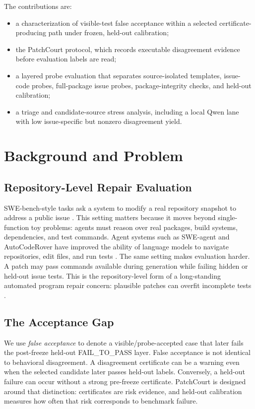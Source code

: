 \documentclass[conference]{IEEEtran}
\newcommand{\patchcourt}{PatchCourt\xspace}
\begin{document}
The contributions are:
\begin{itemize}[leftmargin=*]
\item a characterization of visible-test false acceptance within a selected certificate-producing path under frozen, held-out calibration;
\item the \patchcourt protocol, which records executable disagreement evidence before evaluation labels are read;
\item a layered probe evaluation that separates source-isolated templates, issue-code probes, full-package issue probes, package-integrity checks, and held-out calibration;
\item a triage and candidate-source stress analysis, including a local Qwen lane with low issue-specific but nonzero disagreement yield.
\end{itemize}

\section{Background and Problem}

\subsection{Repository-Level Repair Evaluation}

SWE-bench-style tasks ask a system to modify a real repository snapshot to address a public issue \cite{jimenez2024swebench}.
This setting matters because it moves beyond single-function toy problems: agents must reason over real packages, build systems, dependencies, and test commands.
Agent systems such as SWE-agent and AutoCodeRover have improved the ability of language models to navigate repositories, edit files, and run tests \cite{yang2024sweagent,zhang2024autocoderover}.
The same setting makes evaluation harder.
A patch may pass commands available during generation while failing hidden or held-out issue tests.
This is the repository-level form of a long-standing automated program repair concern: plausible patches can overfit incomplete tests \cite{qi2015plausibility,smith2015overfitting,ye2021automated}.

\subsection{The Acceptance Gap}

We use \emph{false acceptance} to denote a visible/probe-accepted case that later fails the post-freeze held-out FAIL\_TO\_PASS layer.
False acceptance is not identical to behavioral disagreement.
A disagreement certificate can be a warning even when the selected candidate later passes held-out labels.
Conversely, a held-out failure can occur without a strong pre-freeze certificate.
\patchcourt is designed around that distinction: certificates are risk evidence, and held-out calibration measures how often that risk corresponds to benchmark failure.
\end{document}
